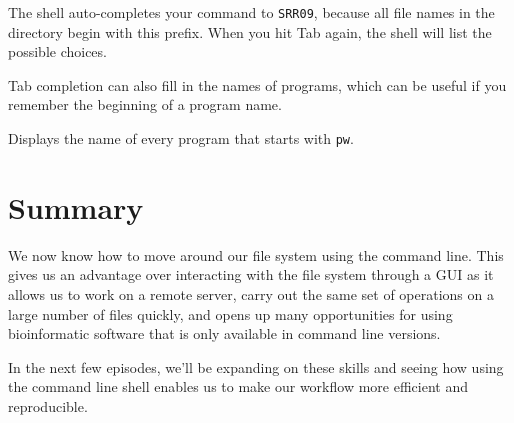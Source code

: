 \documentclass[
  letterpaper,
  DIV=11,
  numbers=noendperiod]{scrreprt}
\newenvironment{Shaded}{\begin{snugshade}}{\end{snugshade}}
\newcommand{\ExtensionTok}[1]{\textcolor[rgb]{0.00,0.23,0.31}{#1}}
\newcommand{\NormalTok}[1]{\textcolor[rgb]{0.00,0.23,0.31}{#1}}
\newcommand{\OperatorTok}[1]{\textcolor[rgb]{0.37,0.37,0.37}{#1}}
\begin{document}
The shell auto-completes your command to \texttt{SRR09}, because all
file names in the directory begin with this prefix. When you hit Tab
again, the shell will list the possible choices.

\begin{Shaded}
\end{Shaded}

Tab completion can also fill in the names of programs, which can be
useful if you remember the beginning of a program name.

\begin{Shaded}
\end{Shaded}

Displays the name of every program that starts with \texttt{pw}.

\section{Summary}\label{summary}

We now know how to move around our file system using the command line.
This gives us an advantage over interacting with the file system through
a GUI as it allows us to work on a remote server, carry out the same set
of operations on a large number of files quickly, and opens up many
opportunities for using bioinformatic software that is only available in
command line versions.

In the next few episodes, we'll be expanding on these skills and seeing
how using the command line shell enables us to make our workflow more
efficient and reproducible.
\end{document}
